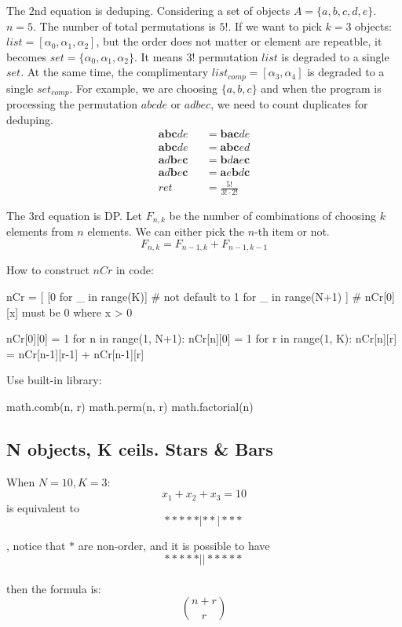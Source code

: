 The 2nd equation is deduping. Considering a set of objects $A = \{a, b, c, d, e\}$. $n = 5$. The number of total permutations is $5!$. If we want to pick $k=3$ objects: $list = [\alpha_0, \alpha_1, \alpha_2]$, but the order does not matter or element are repeatble, it becomes $set = \{\alpha_0, \alpha_1, \alpha_2\}$. It means $3!$ permutation $list$ is degraded to a single $set$. At the same time, the complimentary $list_{comp} = [\alpha_3, \alpha_4]$ is degraded to a single $set_{comp}$. For example, we are choosing $\{a, b, c\}$ and when the program is processing the permutation $abcde$ or $adbec$, we need to count duplicates for deduping. 
\begin{eqnarray*}
\mathbf{abc}de &&= \mathbf{bac}de \\
\mathbf{abc}de && = \mathbf{abc}ed \\
\mathbf{a}d\mathbf{b}e\mathbf{c} &&= \mathbf{b}d\mathbf{a}e\mathbf{c} \\
\mathbf{a}d\mathbf{b}e\mathbf{c} && = \mathbf{a}e\mathbf{b}d\mathbf{c} \\
ret &&= \frac{5!}{3! \cdot 2!}
\end{eqnarray*}

The 3rd equation is DP. Let $F_{n, k}$ be the number of combinations of choosing $k$ elements from $n$ elements. We can either pick the $n$-th item or not. 
$$
F_{n,k} = F_{n-1, k} + F_{n-1, k-1}
$$

How to construct $nCr$ in code:
\begin{python}
nCr = [
    [0 for _ in range(K)]  # not default to 1
    for _ in range(N+1)
]
# nCr[0][x] must be 0 where x > 0

nCr[0][0] = 1
for n in range(1, N+1):
    nCr[n][0] = 1
    for r in range(1, K):
        nCr[n][r] = nCr[n-1][r-1] + nCr[n-1][r]
\end{python}

Use built-in library: 
\begin{python}
math.comb(n, r)
math.perm(n, r)
math.factorial(n)
\end{python}

\subsection{N objects, K ceils. Stars \& Bars}
When $N=10, K=3$:
$$
x_1 + x_2 + x_3 = 10
$$
is equivalent to
$$
*****|**|***
$$

, notice that $*$ are non-order, and it is possible to have 
$$
*****||*****
$$
\\
then the formula is:
$$
{n+r \choose r}
$$

